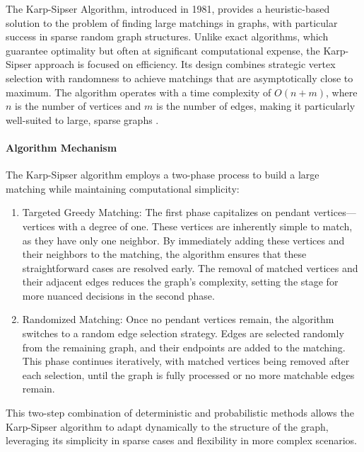 
The Karp-Sipser Algorithm, introduced in 1981, provides a heuristic-based solution to the problem of finding large matchings in graphs, with particular success in sparse random graph structures. Unlike exact algorithms, which guarantee optimality but often at significant computational expense, the Karp-Sipser approach is focused on efficiency. Its design combines strategic vertex selection with randomness to achieve matchings that are asymptotically close to maximum. The algorithm operates with a time complexity of \(O(n + m)\), where \(n\) is the number of vertices and \(m\) is the number of edges, making it particularly well-suited to large, sparse graphs \cite{aronson1997maximum}.

\paragraph{Algorithm Mechanism}
The Karp-Sipser algorithm employs a two-phase process to build a large matching while maintaining computational simplicity:
\begin{enumerate}
    \item Targeted Greedy Matching:
    The first phase capitalizes on pendant vertices—vertices with a degree of one. These vertices are inherently simple to match, as they have only one neighbor. By immediately adding these vertices and their neighbors to the matching, the algorithm ensures that these straightforward cases are resolved early. The removal of matched vertices and their adjacent edges reduces the graph’s complexity, setting the stage for more nuanced decisions in the second phase.
    
    \item Randomized Matching:
    Once no pendant vertices remain, the algorithm switches to a random edge selection strategy. Edges are selected randomly from the remaining graph, and their endpoints are added to the matching. This phase continues iteratively, with matched vertices being removed after each selection, until the graph is fully processed or no more matchable edges remain.
\end{enumerate}

This two-step combination of deterministic and probabilistic methods allows the Karp-Sipser algorithm to adapt dynamically to the structure of the graph, leveraging its simplicity in sparse cases and flexibility in more complex scenarios.

